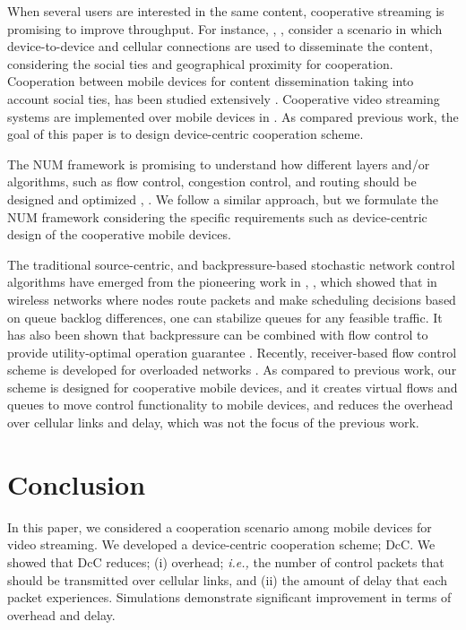 \documentclass[conference]{IEEEtran}
\newcommand{\ie}{{\em i.e., }}
\begin{document}
When several users are interested in the same content, cooperative streaming is promising to improve throughput. For instance, \cite{micro1}, \cite{micro2}, \cite{micro3} consider a scenario in which device-to-device and cellular connections are used to disseminate the content, considering the social ties and geographical proximity for cooperation. Cooperation between mobile devices for content dissemination taking into account social ties, has been studied extensively  \cite{micro4,micro5}. Cooperative video streaming systems are implemented over mobile devices in \cite{micro6, micro7}. As compared previous work, the goal of this paper is to design device-centric cooperation scheme.

The NUM framework is promising to understand how different layers and/or algorithms, such as flow control, congestion control, and routing should be designed and optimized \cite{tutorial_doyle}, \cite{tutorial_lin}. We follow a similar approach, but we formulate the NUM framework considering the specific requirements such as device-centric design of the cooperative mobile devices.

The traditional source-centric, and backpressure-based stochastic network control algorithms have emerged from the pioneering work in \cite{tass1}, \cite{tass2}, which showed that in wireless networks where nodes route packets and make scheduling decisions based on queue backlog differences, one can stabilize queues for any feasible traffic. It has also been shown that backpressure can be combined with flow control to provide utility-optimal operation guarantee \cite{neelymoli}. Recently, receiver-based flow control scheme is developed for overloaded networks \cite{limod}. As compared to previous work, our scheme is designed for cooperative mobile devices, and it creates virtual flows and queues to move control functionality to mobile devices, and reduces the overhead over cellular links and delay, which was not the focus of the previous work.

\section{\label{sec:conclusion}Conclusion}
In this paper, we considered a cooperation scenario among mobile devices for video streaming. We developed a device-centric cooperation scheme; DcC. We showed that DcC reduces; (i) overhead; \ie the number of control packets that should be transmitted over cellular links, and (ii) the amount of delay that each packet experiences. Simulations demonstrate significant improvement in terms of overhead and delay.
\end{document}
